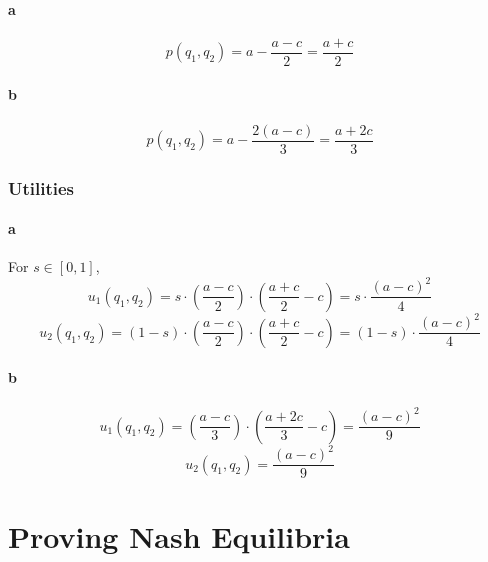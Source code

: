\paragraph{a}
\[p(q_1,q_2)=a-\frac{a-c}{2}=\frac{a+c}{2}\]
\paragraph{b}
\[p(q_1,q_2)=a-\frac{2(a-c)}{3}=\frac{a+2c}{3}\]

\subsubsection{Utilities}
\paragraph{a}
For $s\in[0,1]$,
\[u_1(q_1,q_2)
=s\cdot\left(\frac{a-c}{2}\right)\cdot\left(\frac{a+c}{2}-c\right)
=s\cdot\frac{(a-c)^2}{4}\]
\[u_2(q_1,q_2)
=(1-s)\cdot\left(\frac{a-c}{2}\right)\cdot\left(\frac{a+c}{2}-c\right)
=(1-s)\cdot\frac{(a-c)^2}{4}\]

\paragraph{b}
\[u_1(q_1,q_2)=\left(\frac{a-c}{3}\right)\cdot\left(\frac{a+2c}{3}-c\right)
=\frac{(a-c)^2}{9}\]
\[u_2(q_1,q_2)=\frac{(a-c)^2}{9}\]

\newpage
\section{Proving Nash Equilibria}
